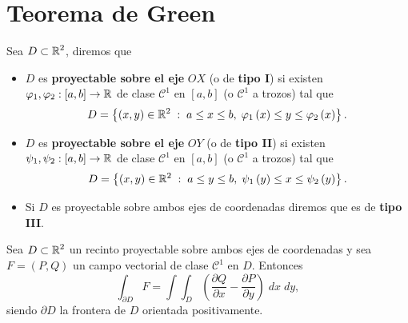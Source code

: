 \section{Teorema de Green}
\begin{definition}
Sea $\displaystyle D \subset \mathbb{R}^{2} $, diremos que
\begin{itemize}
	\item $\displaystyle D $ es \textbf{proyectable sobre el eje} $\displaystyle OX $ (o de \textbf{tipo I}) si existen $\displaystyle \varphi_{1}, \varphi_{2} : \left[a,b\right] \to \mathbb{R} $ de clase $\displaystyle \mathcal{C}^{1} $ en $\displaystyle \left[a,b\right]  $ (o $\displaystyle \mathcal{C}^{1} $ a trozos) tal que  
		\[D = \left\{ \left(x,y\right) \in \mathbb{R}^{2}\; : \; a \leq x \leq b, \; \varphi_{1}\left(x\right)\leq y \leq \varphi_{2}\left(x\right)\right\} .\]
	\item $\displaystyle D $ es \textbf{proyectable sobre el eje} $\displaystyle OY $ (o de \textbf{tipo II}) si existen $\displaystyle \psi_{1}, \psi_{2} : \left[a,b\right] \to \mathbb{R} $ de clase $\displaystyle \mathcal{C}^{1} $ en $\displaystyle \left[a,b\right]  $ (o $\displaystyle \mathcal{C}^{1} $ a trozos) tal que 
		\[D = \left\{ \left(x,y\right)\in \mathbb{R}^{2} \; : \; a \leq y \leq b, \; \psi_{1}\left(y\right)\leq x \leq \psi_{2}\left(y\right)\right\}  .\]
	\item Si $\displaystyle D $ es proyectable sobre ambos ejes de coordenadas diremos que es de \textbf{tipo III}. 
\end{itemize}
\end{definition}
\begin{theorem}
Sea $\displaystyle D \subset \mathbb{R}^{2} $ un recinto proyectable sobre ambos ejes de coordenadas y sea $\displaystyle F = \left(P,Q\right) $ un campo vectorial de clase $\displaystyle \mathcal{C}^{1} $ en $\displaystyle D $. Entonces
\[\int _{\partial D}F =\int \int _{D}\left(\frac{\partial Q}{\partial x}-\frac{\partial P}{\partial y}\right) \; dx \; dy ,\]
siendo $\displaystyle \partial D $ la frontera de $\displaystyle D $ orientada positivamente. 
\end{theorem}
